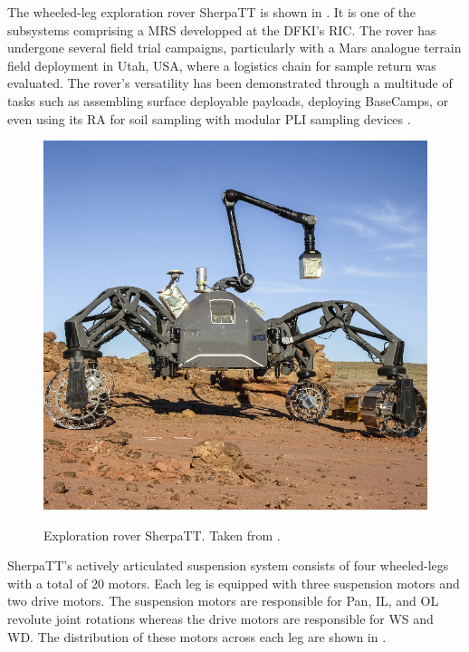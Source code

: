 The wheeled-leg exploration rover SherpaTT is shown in . It is one of the subsystems comprising a \ac{MRS} developped at the \ac{DFKI}'s \ac{RIC}. The rover has undergone several field trial campaigns, particularly with a Mars analogue terrain field deployment  in Utah, USA, where a logistics chain for sample return was evaluated. The rover's versatility has been demonstrated through a multitude of tasks such as assembling surface deployable payloads, deploying BaseCamps, or even using its \ac{RA} for soil sampling with modular \ac{PLI} sampling devices .

\begin{figure}[h]
  \centering
  \hypersetup{linkcolor=captionTextColor}
  \includegraphics[width=0.6\linewidth]{sections/introduction/background/images/sherpa-tt.png}\\
  \caption[Exploration rover SherpaTT]
          {Exploration rover SherpaTT. Taken from .}
  \label{fig:sherpatt}
\end{figure}


SherpaTT's actively articulated suspension system consists of four wheeled-legs with a total of 20 motors. Each leg is equipped with three suspension motors and two drive motors. The suspension motors are responsible for Pan, \ac{IL}, and \ac{OL} revolute joint rotations whereas the drive motors are responsible for \ac{WS} and \ac{WD}. The distribution of these motors across each leg are shown in .

